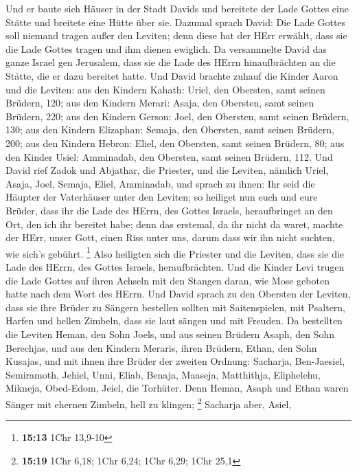  Und er baute sich Häuser in der Stadt Davids und
bereitete der Lade Gottes eine Stätte und breitete eine Hütte über sie.
 Dazumal sprach David: Die Lade Gottes soll niemand tragen
außer den Leviten; denn diese hat der HErr erwählt, dass sie die Lade
Gottes tragen und ihm dienen ewiglich.  Da versammelte
David das ganze Israel gen Jerusalem, dass sie die Lade des HErrn
hinaufbrächten an die Stätte, die er dazu bereitet hatte. 
Und David brachte zuhauf die Kinder Aaron und die Leviten:
 aus den Kindern Kahath: Uriel, den Obersten, samt seinen
Brüdern, 120;  aus den Kindern Merari: Asaja, den
Obersten, samt seinen Brüdern, 220;  aus den Kindern
Gerson: Joel, den Obersten, samt seinen Brüdern, 130;  aus
den Kindern Elizaphan: Semaja, den Obersten, samt seinen Brüdern, 200;
 aus den Kindern Hebron: Eliel, den Obersten, samt seinen
Brüdern, 80;  aus den Kinder Usiel: Amminadab, den
Obersten, samt seinen Brüdern, 112.  Und David rief Zadok
und Abjathar, die Priester, und die Leviten, nämlich Uriel, Asaja, Joel,
Semaja, Eliel, Amminadab,  und sprach zu ihnen: Ihr seid
die Häupter der Vaterhäuser unter den Leviten; so heiliget nun euch und
eure Brüder, dass ihr die Lade des HErrn, des Gottes Israels,
heraufbringet an den Ort, den ich ihr bereitet habe; 
denn das erstemal, da ihr nicht da waret, machte der HErr, unser Gott,
einen Riss unter uns, darum dass wir ihn nicht suchten, wie sich's
gebührt. \footnote{\textbf{15:13} 1Chr 13,9-10}  Also
heiligten sich die Priester und die Leviten, dass sie die Lade des
HErrn, des Gottes Israels, heraufbrächten.  Und die
Kinder Levi trugen die Lade Gottes auf ihren Achseln mit den Stangen
daran, wie Mose geboten hatte nach dem Wort des HErrn. 
Und David sprach zu den Obersten der Leviten, dass sie ihre Brüder zu
Sängern bestellen sollten mit Saitenspielen, mit Psaltern, Harfen und
hellen Zimbeln, dass sie laut sängen und mit Freuden.  Da
bestellten die Leviten Heman, den Sohn Joels, und aus seinen Brüdern
Asaph, den Sohn Berechjas, und aus den Kindern Meraris, ihren Brüdern,
Ethan, den Sohn Kusajas,  und mit ihnen ihre Brüder der
zweiten Ordnung: Sacharja, Ben-Jaesiel, Semiramoth, Jehiel, Unni, Eliab,
Benaja, Maaseja, Matthithja, Eliphelehu, Mikneja, Obed-Edom, Jeiel, die
Torhüter.  Denn Heman, Asaph und Ethan waren Sänger mit
ehernen Zimbeln, hell zu klingen; \footnote{\textbf{15:19} 1Chr 6,18;
  1Chr 6,24; 1Chr 6,29; 1Chr 25,1}  Sacharja aber, Asiel,
